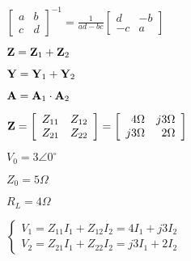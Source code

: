 \documentclass{article}
\def\lthtmlcheckvsize{\ifdim\ht\sizebox<\vsize 
  \ifdim\wd\sizebox<\hsize\expandafter\hfill\fi \expandafter\vfill
  \else\expandafter\vss\fi}%
\begin{document}
{\newpage\clearpage
{}%
$\displaystyle \left[ \begin{array}{rr} a & b \\c & d \end{array} \right]^{-1}
=\frac{1}{ad-bc}\left[ \begin{array}{rr} d & -b \\-c & a \end{array} \right]$%
\lthtmlindisplaymathZ
\lthtmlcheckvsize\clearpage}

{\newpage\clearpage
{}%
$ {\bf Z}={\bf Z}_1+{\bf Z}_2$%
\lthtmlindisplaymathZ
\lthtmlcheckvsize\clearpage}

{\newpage\clearpage
{}%
$ {\bf Y}={\bf Y}_1+{\bf Y}_2$%
\lthtmlindisplaymathZ
\lthtmlcheckvsize\clearpage}

{\newpage\clearpage
{}%
$ {\bf A}={\bf A}_1 \cdot {\bf A}_2$%
\lthtmlindisplaymathZ
\lthtmlcheckvsize\clearpage}

{\newpage\clearpage
{}%
$\displaystyle {\bf Z}=\left[\begin{array}{ll} Z_{11} & Z_{12} \\
Z_{21} & Z_{22} \end{array}\right]
=\left[\begin{array}{rr} 4\Omega & j3\Omega \\
j3\Omega & 2\Omega \end{array}\right]$%
\lthtmlindisplaymathZ
\lthtmlcheckvsize\clearpage}

{\newpage\clearpage
{}%
$ V_0=3\angle 0^\circ$%
\lthtmlindisplaymathZ
\lthtmlcheckvsize\clearpage}

{\newpage\clearpage
{}%
$ Z_0=5\Omega$%
\lthtmlindisplaymathZ
\lthtmlcheckvsize\clearpage}

{\newpage\clearpage
{}%
$ R_L=4\Omega$%
\lthtmlindisplaymathZ
\lthtmlcheckvsize\clearpage}

{\newpage\clearpage
{}%
$\displaystyle \left\{ \begin{array}{l} V_1=Z_{11}I_1+Z_{12}I_2= 4I_1+j3I_2 \\
V_2=Z_{21}I_1+Z_{22}I_2=j3I_1+ 2I_2 \end{array} \right.$%
\lthtmlindisplaymathZ
\lthtmlcheckvsize\clearpage}
\end{document}
